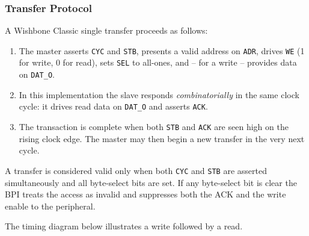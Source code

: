 \subsubsection{Transfer Protocol}

A Wishbone Classic single transfer proceeds as follows:

\begin{enumerate}
  \item The master asserts \texttt{CYC} and \texttt{STB}, presents a valid
    address on \texttt{ADR}, drives \texttt{WE} (1 for write, 0 for read),
    sets \texttt{SEL} to all-ones, and -- for a write -- provides data on
    \texttt{DAT\_O}.
  \item In this implementation the slave responds \emph{combinatorially} in the
    same clock cycle: it drives read data on \texttt{DAT\_O} and asserts
    \texttt{ACK}.
  \item The transaction is complete when both \texttt{STB} and \texttt{ACK}
    are seen high on the rising clock edge.
    The master may then begin a new transfer in the very next cycle.
\end{enumerate}

A transfer is considered valid only when both \texttt{CYC} and \texttt{STB}
are asserted simultaneously and all byte-select bits are set.
If any byte-select bit is clear the BPI treats the access as invalid and
suppresses both the ACK and the write enable to the peripheral.

The timing diagram below illustrates a write followed by a read.

